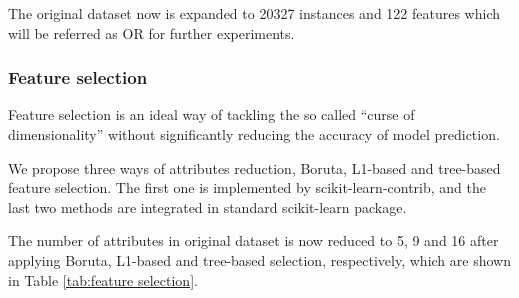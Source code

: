 The original dataset now is expanded to 20327 instances and 122 features which will be referred as OR for further experiments.
\subsubsection{Feature selection}
Feature selection is an ideal way of tackling the so called “curse of dimensionality” without significantly reducing the accuracy of model prediction.

We propose three ways of attributes reduction, Boruta\citep{Kursa}, L1-based\citep{Richard} and tree-based feature selection. The first one is implemented by scikit-learn-contrib, and the last two methods are integrated in standard scikit-learn package.

The number of attributes in original dataset is now reduced to 5, 9 and 16 after applying Boruta, L1-based and tree-based selection, respectively, which are shown in Table \ref{tab:feature selection}.

